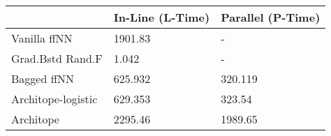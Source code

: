 \begin{tabular}{lll}
\toprule
{} & In-Line (L-Time) & Parallel (P-Time) \\
\midrule
Vanilla ffNN       &          1901.83 &                 - \\
Grad.Bstd Rand.F   &            1.042 &                 - \\
Bagged ffNN        &          625.932 &           320.119 \\
Architope-logistic &          629.353 &            323.54 \\
Architope          &          2295.46 &           1989.65 \\
\bottomrule
\end{tabular}
